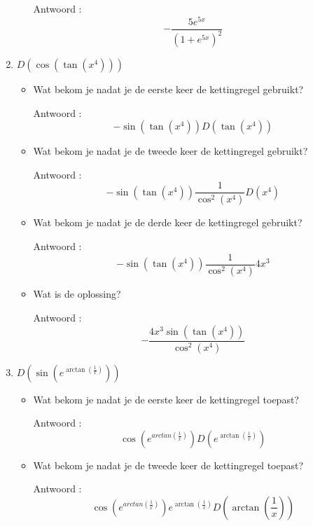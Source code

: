 \begin{enumerate}
\begin{itemize}
		Antwoord : \[-\frac {5e^{5x}}{\left( 1+e^{5x}  \right)^2}\]
		
	\end{itemize}
	
	\item $D \left( \cos \left( \tan \left(  x^4 \right)  \right)  \right)$
	
	\begin{itemize}
		
		\item Wat bekom je nadat je de eerste keer de kettingregel gebruikt?
		
		Antwoord : \[-\sin \left( \tan \left(  x^4  \right)  \right)D \left( \tan \left( x^4  \right)  \right)\]
		
		\item Wat bekom je nadat je de tweede keer de kettingregel gebruikt?
		
		Antwoord : \[-\sin \left( \tan \left(  x^4  \right)  \right)\frac{1}{\cos^2 \left( x^4  \right)}D\left(  x^4 \right)\]
		
		\item Wat bekom je nadat je de derde keer de kettingregel gebruikt?
		
		Antwoord :  \[-\sin \left( \tan \left(  x^4  \right)  \right)\frac{1}{\cos^2 \left( x^4  \right)}4x^3\]
		
		\item Wat is de oplossing?
		
		Antwoord : \[-\frac{4x^3\sin \left( \tan \left(  x^4  \right)  \right)}{\cos^2 \left( x^4  \right)}\]
		
	\end{itemize}
	
	\item $D \left(  \sin \left(  e^{\arctan \left(  \frac{1}{x}  \right) } \right)  \right)$
	
	\begin{itemize}
		
		\item Wat bekom je nadat je de eerste keer de kettingregel toepast?
		
		Antwoord : \[\cos \left(  e^{arctan \left(  \frac{1}{x}  \right) } \right) D \left(  e^{\arctan \left(  \frac{1}{x}  \right) }  \right)\]
		
		\item Wat bekom je nadat je de tweede keer de kettingregel toepast?
		
		Antwoord : \[\cos \left(  e^{arctan \left(  \frac{1}{x}  \right) } \right) e^{\arctan \left(  \frac{1}{x}  \right) }D \left( \arctan \left(  \frac{1}{x}  \right)  \right)\]
		

\end{itemize}
\end{enumerate}

